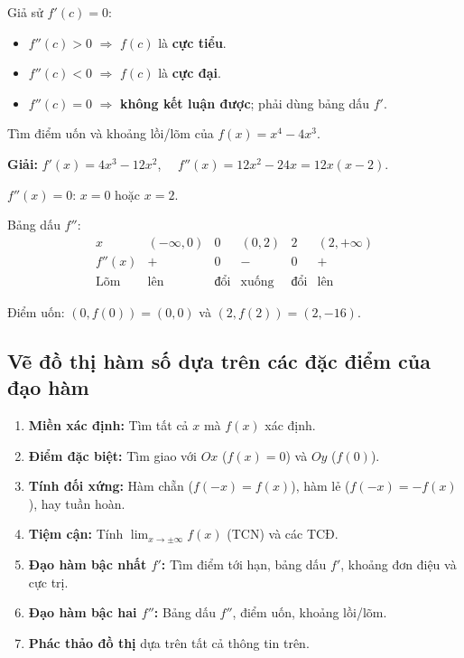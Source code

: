 \documentclass[12pt,a4paper]{article}
\begin{document}
\begin{dinhly}[title={Kiểm tra đạo hàm bậc hai để tìm cực trị}]
  Giả sử $f'(c) = 0$:
  \begin{itemize}
    \item $f''(c) > 0$ $\Rightarrow$ $f(c)$ là \textbf{cực tiểu}.
    \item $f''(c) < 0$ $\Rightarrow$ $f(c)$ là \textbf{cực đại}.
    \item $f''(c) = 0$ $\Rightarrow$ \textbf{không kết luận được}; phải dùng bảng dấu $f'$.
  \end{itemize}
\end{dinhly}

\begin{vidu}
  Tìm điểm uốn và khoảng lồi/lõm của $f(x) = x^4 - 4x^3$.

  \medskip\textbf{Giải:}
  $f'(x) = 4x^3 - 12x^2$, $\quad f''(x) = 12x^2 - 24x = 12x(x-2)$.

  $f''(x) = 0$: $x = 0$ hoặc $x = 2$.

  Bảng dấu $f''$:
  \[
    \begin{array}{c|ccccc}
      x & (-\infty, 0) & 0 & (0, 2) & 2 & (2, +\infty) \\
      \hline
      f''(x) & + & 0 & - & 0 & + \\
      \hline
      \text{Lõm} & \text{lên} & \text{đổi} & \text{xuống} & \text{đổi} & \text{lên}
    \end{array}
  \]

  Điểm uốn: $(0, f(0)) = (0, 0)$ và $(2, f(2)) = (2, -16)$.
\end{vidu}

\subsection{Vẽ đồ thị hàm số dựa trên các đặc điểm của đạo hàm}

\begin{phuongphap}[title={Quy trình vẽ đồ thị đầy đủ (Curve Sketching)}]
  \begin{enumerate}
    \item \textbf{Miền xác định:} Tìm tất cả $x$ mà $f(x)$ xác định.
    \item \textbf{Điểm đặc biệt:} Tìm giao với $Ox$ ($f(x)=0$) và $Oy$ ($f(0)$).
    \item \textbf{Tính đối xứng:} Hàm chẵn ($f(-x)=f(x)$), hàm lẻ ($f(-x)=-f(x)$), hay tuần hoàn.
    \item \textbf{Tiệm cận:} Tính $\lim_{x\to\pm\infty} f(x)$ (TCN) và các TCĐ.
    \item \textbf{Đạo hàm bậc nhất $f'$:} Tìm điểm tới hạn, bảng dấu $f'$, khoảng đơn điệu và cực trị.
    \item \textbf{Đạo hàm bậc hai $f''$:} Bảng dấu $f''$, điểm uốn, khoảng lồi/lõm.
    \item \textbf{Phác thảo đồ thị} dựa trên tất cả thông tin trên.
  \end{enumerate}
\end{phuongphap}
\end{document}
